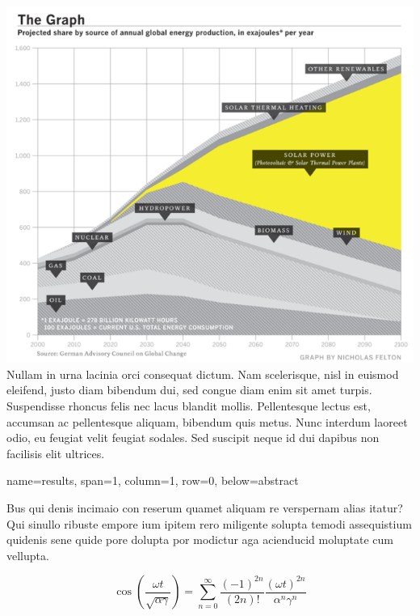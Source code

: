 \documentclass[a0paper,portrait]{baposter}
\begin{document}
\begin{poster}
{\vspace{3mm}
\hspace{1.5mm}
\begin{minipage}{0.95\textwidth}
\begin{multicols}{2}
\includegraphics[width=0.95\columnwidth]{sample-graph.png}
\vfill\null
\columnbreak
\footnotesize
Nullam in urna lacinia orci consequat dictum. Nam scelerisque, nisl in euismod eleifend, justo diam bibendum dui, sed congue diam enim sit amet turpis. Suspendisse rhoncus felis nec lacus blandit mollis. Pellentesque lectus est, accumsan ac pellentesque aliquam, bibendum quis metus. Nunc interdum laoreet odio, eu feugiat velit feugiat sodales. Sed suscipit neque id dui dapibus non facilisis elit ultrices.
\vfill\null
\end{multicols}
\end{minipage}
}


{name=results, span=1, column=1, row=0, below=abstract}{
\setlength{\parskip}{0.5em}

\begin{multicols}{2}

\small

Bus qui denis incimaio con reserum quamet aliquam re verspernam alias itatur? Qui sinullo ribuste empore ium ipitem rero miligente solupta temodi assequistium quidenis sene quide pore dolupta por modictur aga acienducid moluptate cum vellupta.

\begin{equation*}
\cos\mathopen{}\left(\frac{\omega t}{\sqrt{\alpha\gamma}}\right)\mathclose{} = \sum_{n=0}^\infty \frac{(-1)^{2n}}{(2n)!} \frac{(\omega t)^{2n}}{\alpha^{n}\gamma^{n}}
\end{equation*}




\end{multicols}}
\end{poster}
\end{document}
